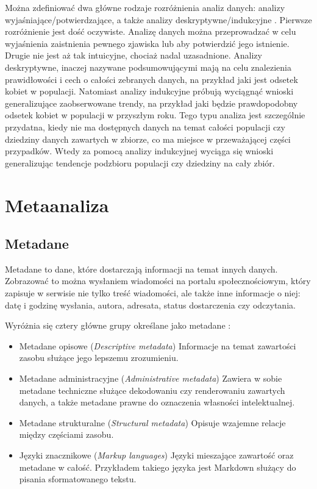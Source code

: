 	Można zdefiniować dwa główne rodzaje rozróżnienia analiz danych: analizy wyjaśniające/potwierdzające, a także analizy deskryptywne/indukcyjne \cite{berthold2003intelligent}.
	Pierwsze rozróżnienie jest dość oczywiste.
	Analizę danych można przeprowadzać w celu wyjaśnienia zaistnienia pewnego zjawiska lub aby potwierdzić jego istnienie.
	Drugie nie jest aż tak intuicyjne, chociaż nadal uzasadnione.
	Analizy deskryptywne, inaczej nazywane podsumowującymi mają na celu znalezienia prawidłowości i cech o całości zebranych danych, na przykład jaki jest odsetek kobiet w populacji.
	Natomiast analizy indukcyjne próbują wyciągnąć wnioski generalizujące zaobserwowane trendy, na przykład jaki będzie prawdopodobny odsetek kobiet w populacji w przyszłym roku.
	Tego typu analiza jest szczególnie przydatna, kiedy nie ma dostępnych danych na temat całości populacji czy dziedziny danych zawartych w zbiorze, co ma miejsce w przeważającej części przypadków.
	Wtedy za pomocą analizy indukcyjnej wyciąga się wnioski generalizując tendencje podzbioru populacji czy dziedziny na cały zbiór.

\section{Metaanaliza}
	\subsection{Metadane}

	Metadane to dane, które dostarczają informacji na temat innych danych.
	Zobrazować to można wysłaniem wiadomości na portalu społecznościowym, który zapisuje w serwisie nie tylko treść wiadomości, ale także inne informacje o niej: datę i godzinę wysłania, autora, adresata, status dostarczenia czy odczytania.

	Wyróżnia się cztery główne grupy określane jako metadane \cite{riley2017understanding}:

	\begin{itemize}
		\item Metadane opisowe (\emph{Descriptive metadata})
		Informacje na temat zawartości zasobu służące jego lepszemu zrozumieniu.

		\item Metadane administracyjne (\emph{Administrative metadata})
		Zawiera w sobie metadane techniczne służące dekodowaniu czy renderowaniu zawartych danych, a także metadane prawne do oznaczenia własności intelektualnej.

		\item Metadane strukturalne (\emph{Structural metadata})
		Opisuje wzajemne relacje między częściami zasobu.

		\item Języki znacznikowe (\emph{Markup languages})
		Języki mieszające zawartość oraz metadane w całość.
		Przykładem takiego języka jest Markdown służący do pisania sformatowanego tekstu.

	\end{itemize}

